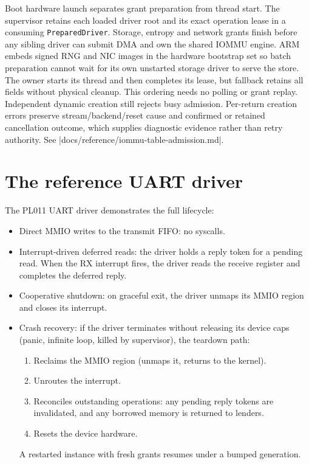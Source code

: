 Boot hardware launch separates grant preparation from thread start. The
supervisor retains each loaded driver root and its exact operation lease in a
consuming \texttt{PreparedDriver}. Storage, entropy and network grants finish
before any sibling driver can submit DMA and own the shared IOMMU engine.
ARM embeds signed RNG and NIC images in the hardware bootstrap set so batch
preparation cannot wait for its own unstarted storage driver to serve the store.
The owner starts its thread and then completes its lease, but fallback retains all
fields without physical cleanup. This ordering needs no polling or grant replay.
Independent dynamic creation still rejects busy admission. Per-return creation
errors preserve stream/backend/reset cause and confirmed or retained cancellation
outcome, which supplies diagnostic evidence rather than retry authority. See
\repofile|docs/reference/iommu-table-admission.md|.

\section{The reference UART driver}

The PL011 UART driver demonstrates the full lifecycle:

\begin{itemize}
    \item Direct MMIO writes to the transmit FIFO: no syscalls.
    \item Interrupt-driven deferred reads: the driver holds a reply
        token for a pending read. When the RX interrupt fires, the driver reads
        the receive register and completes the deferred reply.
    \item Cooperative shutdown: on graceful exit, the driver unmaps its
        MMIO region and closes its interrupt.
    \item Crash recovery: if the driver terminates without releasing
        its device caps (panic, infinite loop, killed by supervisor), the
        teardown path:
        \begin{enumerate}
            \item Reclaims the MMIO region (unmaps it, returns to the kernel).
            \item Unroutes the interrupt.
            \item Reconciles outstanding operations: any pending reply tokens
                are invalidated, and any borrowed memory is returned to lenders.
            \item Resets the device hardware.
        \end{enumerate}
        A restarted instance with fresh grants resumes under a bumped
        generation.
\end{itemize}


